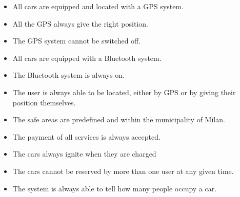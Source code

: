 \documentclass{article}
\begin{document}
			\begin{itemize}
				\item All cars are equipped and located with a GPS system.
				\item All the GPS always give the right position.
				\item The GPS system cannot be switched off.
				\item All cars are equipped with a Bluetooth system.
				\item The Bluetooth system is always on.
				\item The user is always able to be located, either by GPS or by giving their position themselves.
				\item The safe areas are predefined and within the municipality of Milan.
				\item The payment of all services is always accepted. %
				\item The cars always ignite when they are charged %
				\item The cars cannot be reserved by more than one user at any given time. %
				\item The system is always able to tell how many people occupy a car. 
			\end{itemize}
\end{document}

